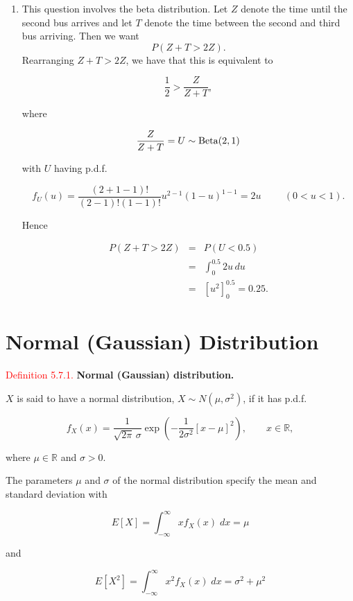 \documentclass[
]{book}
\providecommand{\tightlist}{%
  \setlength{\itemsep}{0pt}\setlength{\parskip}{0pt}}
\begin{document}
\begin{enumerate}
\def\labelenumi{(\alph{enumi})}
\setcounter{enumi}{3}
\tightlist
\item
  This question involves the beta distribution. Let \(Z\) denote the time until the second bus arrives and let \(T\) denote the time between the second and third bus arriving. Then we want \[P(Z+T>2Z). \]
  Rearranging \(Z+T >2 Z\), we have that this is equivalent to

  \[\frac{1}{2}> \frac{Z}{Z+T},\]

  where

  \[\frac{Z}{Z+T} = U \sim {\rm Beta} (2,1)\]

  with \(U\) having p.d.f.

  \[ f_U (u) = \frac{(2+1-1)!}{(2-1)! (1-1)!} u^{2-1} (1-u)^{1-1} = 2u \hspace{1cm} (0<u<1).\]

  Hence

  \begin{eqnarray*} P(Z+T>2Z) &=&P(U < 0.5)  \\ &=& \int_0^{0.5} 2 u \, du \\ &=& \left[ u^2 \right]_0^{0.5} =0.25. 
  \end{eqnarray*}
\end{enumerate}

\hypertarget{rv:normal}{%
\section{Normal (Gaussian) Distribution}\label{rv:normal}}

\leavevmode{}%
\textcolor{red}{Definition 5.7.1.}
{\textbf{Normal (Gaussian) distribution.}}

\(X\) is said to have a normal distribution, \(X \sim N(\mu, \sigma^{2})\), if it has p.d.f.

\[
f_X (x) = \frac{1}{\sqrt{2 \pi} \, \sigma} \exp \left( - \frac{1}{2 \sigma^2} [x-\mu]^2 \right), \quad \quad  x \in \mathbb{R},
\]

where \(\mu \in \mathbb{R}\) and \(\sigma > 0\).

The parameters \(\mu\) and \(\sigma\) of the normal distribution specify the mean and standard deviation with

\[ E[X] = \int_{- \infty}^{\infty} x f_X(x) \; dx = \mu\]

and

\[ E[X^2] =  \int_{- \infty}^{\infty} x^{2} f_X(x) \; dx = \sigma^{2} + \mu^{2}\]
\end{document}
